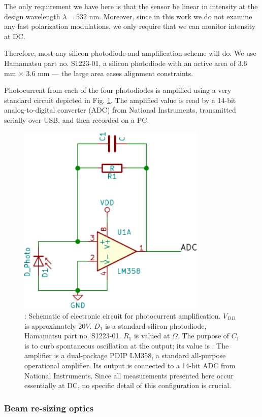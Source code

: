 \documentclass[footinbib,aps,prl,superscriptaddress]{revtex4-1}
\begin{document}
The only requirement we have here is that the sensor be linear in intensity at the design wavelength $\lambda=532$ nm. Moreover, since in this work we do not examine any fast polarization modulations, we only require that we can monitor intensity at DC.

Therefore, most any silicon photodiode and amplification scheme will do. We use Hamamatsu part no. S1223-01, a silicon photodiode with an active area of $3.6$ mm $\times$ $3.6$ mm --- the large area eases alignment constraints.

Photocurrent from each of the four photodiodes is amplified using a very standard circuit depicted in Fig. \ref{fig:circuit}. The amplified value is read by a 14-bit analog-to-digital converter (ADC) from National Instruments, transmitted serially over USB, and then recorded on a PC.

\begin{figure}[!htp]
	\centering
	\includegraphics[width=9cm]{Circuit_Schematic.pdf}
	\caption{\label{fig:circuit}: Schematic of electronic circuit for photocurrent amplification. $V_{DD}$ is approximately $20V$. $D_1$ is a standard silicon photodiode, Hamamatsu part no. S1223-01. $R_1$ is valued at $\Omega$. The purpose of $C_1$ is to curb spontaneous oscillation at the output; its value is  . The amplifier is a dual-package PDIP LM358, a standard all-purpose operational amplifier. Its output is connected to a 14-bit ADC from National Instruments. Since all measurements presented here occur essentially at DC, no specific detail of this configuration is crucial.}
\end{figure}

\subsubsection{Beam re-sizing optics}
\end{document}
